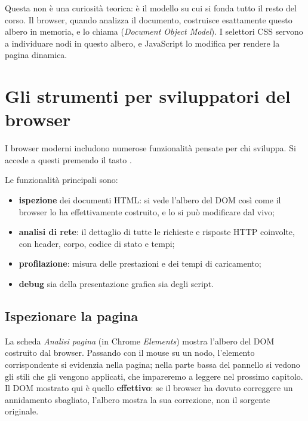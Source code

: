 Questa non è una curiosità teorica: è il modello su cui si fonda tutto il resto
del corso. Il browser, quando analizza il documento, costruisce esattamente
questo albero in memoria, e lo chiama  (\textit{Document Object
Model}). I selettori CSS servono a individuare nodi in questo albero, e
JavaScript lo modifica per rendere la pagina dinamica.


\section{Gli strumenti per sviluppatori del browser}

I browser moderni includono numerose funzionalità pensate per chi sviluppa. Si
accede a questi  premendo il tasto .

Le funzionalità principali sono:

\begin{itemize}
  \item \textbf{ispezione} dei documenti HTML: si vede l'albero del DOM così come
        il browser lo ha effettivamente costruito, e lo si può modificare dal
        vivo;
  \item \textbf{analisi di rete}: il dettaglio di tutte le richieste e risposte
        HTTP coinvolte, con header, corpo, codice di stato e tempi;
  \item \textbf{profilazione}: misura delle prestazioni e dei tempi di
        caricamento;
  \item \textbf{debug} sia della presentazione grafica sia degli script.
\end{itemize}

\subsection{Ispezionare la pagina}

La scheda \textit{Analisi pagina} (in Chrome \textit{Elements}) mostra l'albero
del DOM costruito dal browser. Passando con il mouse su un nodo, l'elemento
corrispondente si evidenzia nella pagina; nella parte bassa del pannello si
vedono gli stili che gli vengono applicati, che impareremo a leggere nel
prossimo capitolo. Il DOM mostrato qui è quello \textbf{effettivo}: se il
browser ha dovuto correggere un annidamento sbagliato, l'albero mostra la sua
correzione, non il sorgente originale.

